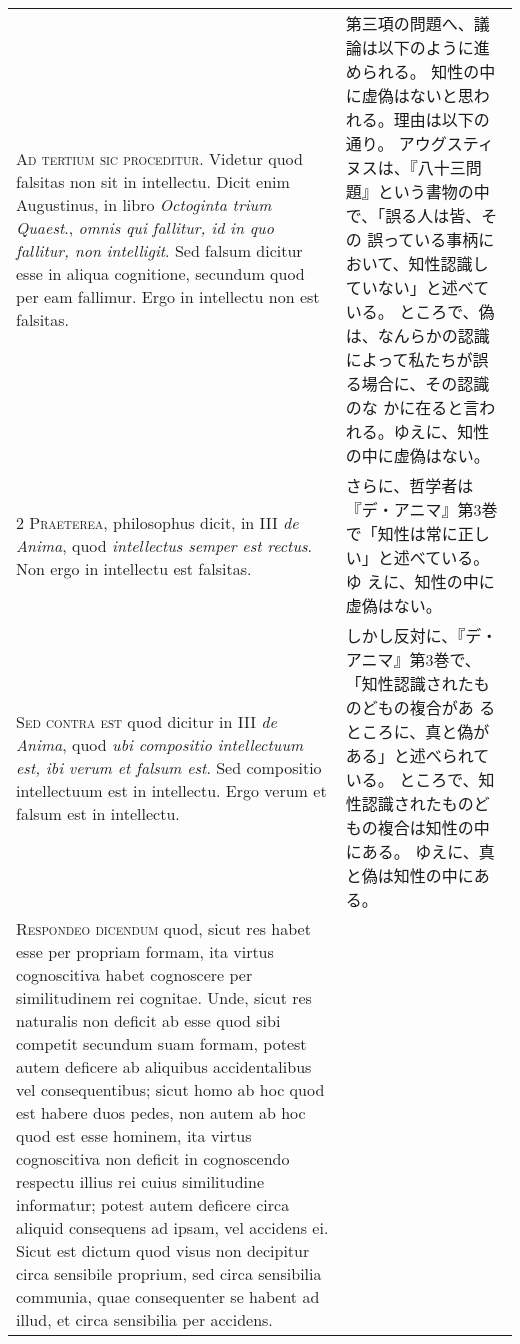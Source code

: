\documentclass[10pt]{jsarticle} %
\begin{document}
\begin{longtable}{p{21em}p{21em}}

{\huge A}{\scshape d tertium sic proceditur}. Videtur quod falsitas non
sit in intellectu. Dicit enim Augustinus, in libro {\itshape Octoginta
trium Quaest}., {\itshape omnis qui fallitur, id in quo fallitur, non
intelligit}. Sed falsum dicitur esse in aliqua cognitione, secundum quod
per eam fallimur. Ergo in intellectu non est falsitas.


&
第三項の問題へ、議論は以下のように進められる。
知性の中に虚偽はないと思われる。理由は以下の通り。
アウグスティヌスは、『八十三問題』という書物の中で、「誤る人は皆、その
 誤っている事柄において、知性認識していない」と述べている。
ところで、偽は、なんらかの認識によって私たちが誤る場合に、その認識のな
 かに在ると言われる。ゆえに、知性の中に虚偽はない。

\\


{\scshape 2 Praeterea}, philosophus dicit, in III {\itshape de Anima},
quod {\itshape intellectus semper est rectus}. Non ergo in intellectu
est falsitas.


&

さらに、哲学者は『デ・アニマ』第3巻で「知性は常に正しい」と述べている。ゆ
 えに、知性の中に虚偽はない。


\\


{\scshape Sed contra est} quod dicitur in III {\itshape de Anima}, quod
{\itshape ubi compositio intellectuum est, ibi verum et falsum est}. Sed
compositio intellectuum est in intellectu. Ergo verum et falsum est in
intellectu.


&

しかし反対に、『デ・アニマ』第3巻で、「知性認識されたものどもの複合があ
 るところに、真と偽がある」と述べられている。
ところで、知性認識されたものどもの複合は知性の中にある。
ゆえに、真と偽は知性の中にある。


\\


{\scshape Respondeo dicendum} quod, sicut res habet esse
per propriam formam, ita virtus cognoscitiva habet cognoscere per
similitudinem rei cognitae. Unde, sicut res naturalis non deficit ab
esse quod sibi competit secundum suam formam, potest autem deficere ab
aliquibus accidentalibus vel consequentibus; sicut homo ab hoc quod est
habere duos pedes, non autem ab hoc quod est esse hominem, ita virtus
cognoscitiva non deficit in cognoscendo respectu illius rei cuius
similitudine informatur; potest autem deficere circa aliquid consequens
ad ipsam, vel accidens ei. Sicut est dictum quod visus non decipitur
circa sensibile proprium, sed circa sensibilia communia, quae
consequenter se habent ad illud, et circa sensibilia per accidens. 





\end{longtable}
\end{document}
